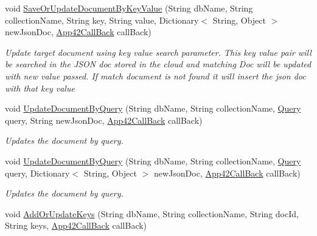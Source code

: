 \begin{DoxyCompactItemize}
void \hyperlink{classcom_1_1shephertz_1_1app42_1_1paas_1_1sdk_1_1csharp_1_1storage_1_1_storage_service_a331cf2dc54c862544f4d11d02b1b90c7}{Save\+Or\+Update\+Document\+By\+Key\+Value} (String db\+Name, String collection\+Name, String key, String value, Dictionary$<$ String, Object $>$ new\+Json\+Doc, \hyperlink{interfacecom_1_1shephertz_1_1app42_1_1paas_1_1sdk_1_1csharp_1_1_app42_call_back}{App42\+Call\+Back} call\+Back)
\begin{DoxyCompactList}\small\item\em Update target document using key value search parameter. This key value pair will be searched in the J\+S\+O\+N doc stored in the cloud and matching Doc will be updated with new value passed. If match document is not found it will insert the json doc with that key value \end{DoxyCompactList}\item 
void \hyperlink{classcom_1_1shephertz_1_1app42_1_1paas_1_1sdk_1_1csharp_1_1storage_1_1_storage_service_a3df2994304188ef7a02768e7ab1160c2}{Update\+Document\+By\+Query} (String db\+Name, String collection\+Name, \hyperlink{classcom_1_1shephertz_1_1app42_1_1paas_1_1sdk_1_1csharp_1_1storage_1_1_query}{Query} query, String new\+Json\+Doc, \hyperlink{interfacecom_1_1shephertz_1_1app42_1_1paas_1_1sdk_1_1csharp_1_1_app42_call_back}{App42\+Call\+Back} call\+Back)
\begin{DoxyCompactList}\small\item\em Updates the document by query. \end{DoxyCompactList}\item 
void \hyperlink{classcom_1_1shephertz_1_1app42_1_1paas_1_1sdk_1_1csharp_1_1storage_1_1_storage_service_a0fe60d5938ff5bbd291a157d4aecb3ae}{Update\+Document\+By\+Query} (String db\+Name, String collection\+Name, \hyperlink{classcom_1_1shephertz_1_1app42_1_1paas_1_1sdk_1_1csharp_1_1storage_1_1_query}{Query} query, Dictionary$<$ String, Object $>$ new\+Json\+Doc, \hyperlink{interfacecom_1_1shephertz_1_1app42_1_1paas_1_1sdk_1_1csharp_1_1_app42_call_back}{App42\+Call\+Back} call\+Back)
\begin{DoxyCompactList}\small\item\em Updates the document by query. \end{DoxyCompactList}\item 
void \hyperlink{classcom_1_1shephertz_1_1app42_1_1paas_1_1sdk_1_1csharp_1_1storage_1_1_storage_service_aa3d2207a0889faaf23bc8955cf02fed3}{Add\+Or\+Update\+Keys} (String db\+Name, String collection\+Name, String doc\+Id, String keys, \hyperlink{interfacecom_1_1shephertz_1_1app42_1_1paas_1_1sdk_1_1csharp_1_1_app42_call_back}{App42\+Call\+Back} call\+Back)

\end{DoxyCompactItemize}
